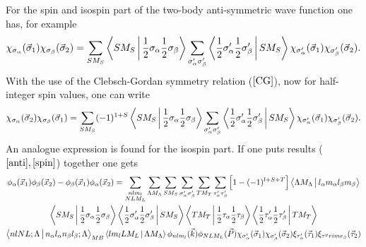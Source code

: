 \documentclass[12pt]{article}
\begin{document}
For the spin and isospin part of the two-body anti-symmetric wave function one has, for example
\begin{align*}
\chi_{\sigma_\alpha}(\vec{\sigma}_1) \chi_{\sigma_\beta}(\vec{\sigma}_2)  = \sum_{S M_S} \Braket{S M_S | \frac{1}{2}  \sigma_\alpha  \frac{1}{2} \sigma_\beta} \sum_{\sigma^{\prime}_\alpha  \sigma^{\prime}_\beta } \Braket{   \frac{1}{2}  \sigma^{\prime}_\alpha  \frac{1}{2} \sigma^{\prime}_\beta | S M_S }  \chi_{\sigma^{\prime}_\alpha}(\vec{\sigma}_1) \chi_{\sigma^{\prime}_\beta}(\vec{\sigma}_2).
\end{align*}
With the use of the Clebsch-Gordan symmetry relation ($\ref{CG}$), now for half-integer spin values, one can write
\begin{align} \label{spin}
\chi_{\sigma_\alpha}(\vec{\sigma}_2) \chi_{\sigma_\beta}(\vec{\sigma}_1)  = \sum_{S M_S}  (-1)^{1 + S} \Braket{S M_S | \frac{1}{2}  \sigma_\alpha  \frac{1}{2} \sigma_\beta} \sum_{\sigma^{\prime}_\alpha  \sigma^{\prime}_\beta } \Braket{   \frac{1}{2}  \sigma^{\prime}_\alpha  \frac{1}{2} \sigma^{\prime}_\beta | S M_S }  \chi_{\sigma^{\prime}_\alpha}(\vec{\sigma}_1) \chi_{\sigma^{\prime}_\beta}(\vec{\sigma}_2).
\end{align}
An analogue expression is found for the isospin part. If one puts results ($\ref{anti}, \ref{spin}$) together one gets
\begin{multline}
\phi_{\alpha}(\vec{x}_1)\phi_{\beta}(\vec{x}_2)  - \phi_{\beta}(\vec{x}_1)\phi_{\alpha}(\vec{x}_2)  = \sum_{\substack{nlm_l \\ NLM_L}}\sum_{\Lambda M_\Lambda} \sum_{S M_S} \sum_{\sigma^{\prime}_\alpha  \sigma^{\prime}_\beta }  \sum_{T M_T} \sum_{\tau^{\prime}_\alpha  \tau^{\prime}_\beta } \left[ 1-(-1)^{l+S+T} \right] \Braket{\Lambda M_\Lambda | l_\alpha m_\alpha l_\beta m_\beta}\\ \Braket{S M_S | \frac{1}{2}  \sigma_\alpha  \frac{1}{2} \sigma_\beta} \Braket{   \frac{1}{2}  \sigma^{\prime}_\alpha  \frac{1}{2} \sigma^{\prime}_\beta | S M_S }  \Braket{T M_T | \frac{1}{2}  \tau_\alpha  \frac{1}{2} \tau_\beta}  \Braket{   \frac{1}{2}  \tau^{\prime}_\alpha  \frac{1}{2} \tau^{\prime}_\beta | T M_T } \\ \Braket{nlNL;\Lambda |  n_\alpha l_\alpha n_\beta l_\beta;\Lambda}_{MB}  \Braket{lm_l L M_L|\Lambda M_\Lambda}  \phi_{nlm_l}(\vec{k}) \phi_{NLM_L}(\vec{P}) \chi_{\sigma^{\prime}_\alpha}(\vec{\sigma}_1) \chi_{\sigma^{\prime}_\beta}(\vec{\sigma}_2) \xi_{\tau^\prime_\alpha}(\vec{\tau}_1) \xi_{\tau^prime_\beta}(\vec{\tau}_2)
\end{multline}
\end{document}
